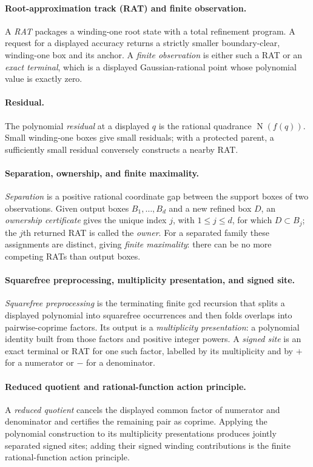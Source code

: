 \documentclass[11pt]{article}
\newcommand{\Norm}[1]{\operatorname{N}\!\left(#1\right)}
\begin{document}
\paragraph{Root-approximation track (RAT) and finite observation.}
A \emph{RAT} packages a winding-one root state with a total refinement
program.  A request for a displayed accuracy returns a strictly smaller
boundary-clear, winding-one box and its anchor.  A \emph{finite observation}
is either such a RAT or an \emph{exact terminal}, which is a displayed
Gaussian-rational point whose polynomial value is exactly zero.

\paragraph{Residual.}
The polynomial \emph{residual} at a displayed $q$ is the rational quadrance
$\Norm{f(q)}$.  Small winding-one boxes give small residuals; with a protected
parent, a sufficiently small residual conversely constructs a nearby RAT.

\paragraph{Separation, ownership, and finite maximality.}
\emph{Separation} is a positive rational coordinate gap between the support
boxes of two observations.  Given output boxes $B_1,\ldots,B_d$ and a new
refined box $D$, an \emph{ownership certificate} gives the unique index
$j$, with $1\le j\le d$, for which $D\subset B_j$; the $j$th returned RAT is
called the \emph{owner}.  For a separated family these assignments are
distinct, giving \emph{finite
maximality}: there can be no more competing RATs than output boxes.

\paragraph{Squarefree preprocessing, multiplicity presentation, and signed
site.}
\emph{Squarefree preprocessing} is the terminating finite gcd recursion that
splits a displayed polynomial into squarefree occurrences and then folds
overlaps into pairwise-coprime factors.  Its output is a \emph{multiplicity
presentation}: a polynomial identity built from those factors and positive
integer powers.  A \emph{signed site} is an exact terminal or RAT for one such
factor, labelled by its multiplicity and by $+$ for a numerator or $-$ for a
denominator.

\paragraph{Reduced quotient and rational-function action principle.}
A \emph{reduced quotient} cancels the displayed common factor of numerator
and denominator and certifies the remaining pair as coprime.  Applying the
polynomial construction to its multiplicity presentations produces jointly
separated signed sites; adding their signed winding contributions is the
finite rational-function action principle.
\end{document}
